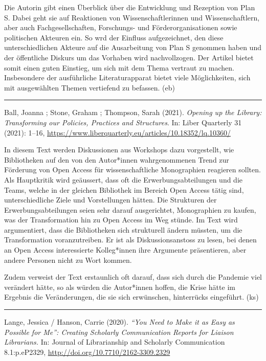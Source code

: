 \documentclass[a4paper,
fontsize=11pt,
oneside,
numbers=noperiodatend,
parskip=half-,
bibliography=totoc,
final
]{scrartcl}
\begin{document}
Die Autorin gibt einen Überblick über die Entwicklung und Rezeption von
Plan S. Dabei geht sie auf Reaktionen von Wissenschaftlerinnen und
Wissenschaftlern, aber auch Fachgesellschaften, Forschungs- und
Förderorganisationen sowie politischen Akteuren ein. So wrd der Einfluss
aufgezeichnet, den diese unterschiedlichen Akteure auf die Ausarbeitung
von Plan S genommen haben und der öffentliche Diskurs um das Vorhaben
wird nachvollzogen. Der Artikel bietet somit einen guten Einstieg, um
sich mit dem Thema vertraut zu machen. Insbesondere der ausführliche
Literaturapparat bietet viele Möglichkeiten, sich mit ausgewählten
Themen vertiefend zu befassen. (eb)

\begin{center}\rule{0.5\linewidth}{0.5pt}\end{center}

Ball, Joanna ; Stone, Graham ; Thompson, Sarah (2021). \emph{Opening up
the Library: Transforming our Policies, Practices and Structures}. In:
Liber Quarterly 31 (2021): 1--16,
\url{https://www.liberquarterly.eu/articles/10.18352/lq.10360/}

In diesem Text werden Diskussionen aus Workshops dazu vorgestellt, wie
Bibliotheken auf den von den Autor*innen wahrgenommenen Trend zur
Förderung von Open Access für wissenschaftliche Monographien reagieren
sollten. Als Hauptkritik wird geäussert, dass oft die
Erwerbungsabteilungen und die Teams, welche in der gleichen Bibliothek
im Bereich Open Access tätig sind, unterschiedliche Ziele und
Vorstellungen hätten. Die Strukturen der Erwerbungsabteilungen seien
sehr darauf ausgerichtet, Monographien zu kaufen, was der Transformation
hin zu Open Access im Weg stünde. Im Text wird argumentiert, dass die
Bibliotheken sich strukturell ändern müssten, um die Transformation
voranzutreiben. Er ist als Diskussionsanstoss zu lesen, bei denen an
Open Access interessierte Kolleg*innen ihre Argumente präsentieren, aber
andere Personen nicht zu Wort kommen.

Zudem verweist der Text erstaunlich oft darauf, dass sich durch die
Pandemie viel verändert hätte, so als würden die Autor*innen hoffen, die
Krise hätte im Ergebnis die Veränderungen, die sie sich erwünschen,
hinterrücks eingeführt. (ks)

\begin{center}\rule{0.5\linewidth}{0.5pt}\end{center}

Lange, Jessica / Hanson, Carrie (2020). \emph{\enquote{You Need to Make
it as Easy as Possible for Me}: Creating Scholarly Communication Reports
for Liaison Librarians.} In: Journal of Librarianship and Scholarly
Communication 8.1:p.eP2329, \url{http://doi.org/10.7710/2162-3309.2329}
\end{document}
